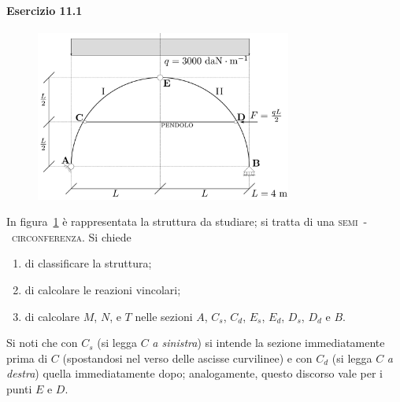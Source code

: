 \paragraph{Esercizio 11.1}
\renewcommand{\thefigure}{11.1~-~1}
\begin{figure}[ht]
\centering
\includegraphics[width=0.75\textwidth]{Immagini/Parte_11/Esercizio11_1_1/esercizio11_1_1.pdf}
\caption{}
\label{Esercizio11-1-1}
\end{figure}
In figura~\ref{Esercizio11-1-1} è rappresentata la struttura da studiare; si tratta di una \textsc{semi}~-~\textsc{circonferenza}. Si chiede 
\begin{enumerate}
\item di classificare la struttura;
\item di calcolare le reazioni vincolari; 
\item di calcolare $M$, $N$, e $T$ nelle sezioni $A$, $C_s$, $C_d$, $E_s$, $E_d$, $D_s$, $D_d$ e $B$. 
\end{enumerate}
Si noti che con $C_s$ (si legga $C$ \emph{a sinistra}) si intende la sezione immediatamente prima di $C$ (spostandosi nel verso delle ascisse curvilinee) e con $C_d$ (si legga $C$ \emph{a destra}) quella immediatamente dopo; analogamente, questo discorso vale per i punti $E$ e $D$. 
